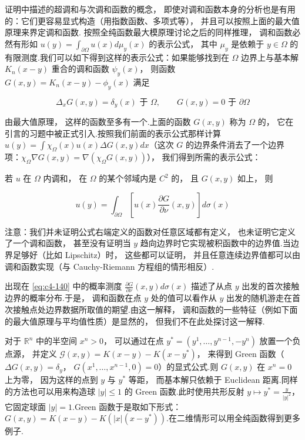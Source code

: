 证明中描述的超调和与次调和函数的概念， 即使对调和函数本身的分析也是有用的：它们更容易显式构造（用指数函数、多项式等）， 并且可以按照上面的最大值原理来界定调和函数.
按照全纯函数最大模原理讨论之后的同样推理， 调和函数必然有形如 $u(y) = \int_{\partial\Omega}u(x)d\mu_{y}(x)$ 的表示公式， 其中 $\mu_{y}$ 是依赖于 $y \in \Omega$ 的有限测度.我们可以如下得到这样的表示公式：如果能够找到在 $\Omega$ 边界上与基本解 $K_{n}(x-y)$ 重合的调和函数 $\psi_{y}(x)$， 则函数 $G(x, y) = K_{n}(x-y) - \phi_{y}(x)$ 满足

\[
\Delta_{x}G(x, y) = \delta_{y}(x) \text{ 于 } \Omega, \qquad G(x, y) = 0 \text{ 于 } \partial\Omega
\]

由最大值原理， 这样的函数至多有一个.上面的函数 $G(x, y)$ 称为 $\Omega$ 的， 它在引言的习题中被正式引入.按照我们前面的表示公式那样计算 $u(y) = \int\chi_{\Omega}(x)u(x)\Delta G(x, y)dx$（这次 $G$ 的边界条件消去了一个边界项：$\chi_{\Omega}\nabla G(x, y) = \nabla(\chi_{\Omega}G(x, y))$）， 我们得到所需的表示公式：

\begin{proposition}\label{prop:c4-2.4}
若 $u$ 在 $\Omega$ 内调和， 在 $\Omega$ 的某个邻域内是 $C^{2}$ 的， 且 $G(x, y)$ 如上， 则

\begin{equation}
u(y) = \int_{\partial\Omega}\left[u(x)\frac{\partial G}{\partial\nu}(x, y)\right]d\sigma(x)\label{eq:c4-140}
\end{equation}
\end{proposition}

\begin{remark*}
注意：我们并未证明公式右端定义的函数对任意区域都有定义， 也未证明它定义了一个调和函数， 甚至没有证明当 $y$ 趋向边界时它实现被积函数中的边界值.当边界足够好（比如 Lipschitz）时， 这些都可以证明， 并且任意连续边界值都可以由调和函数实现（与 Cauchy-Riemann 方程组的情形相反）.
\end{remark*}

出现在 \eqref{eq:c4-140} 中的概率测度 $\frac{\partial G}{\partial\nu}(x, y)d\sigma(x)$ 描述了从点 $y$ 出发的首次接触边界的概率分布.于是， 调和函数在点 $y$ 处的值可以看作从 $y$ 出发的随机游走在首次接触点处边界数据所取值的期望.由这一解释， 调和函数的一些特征（例如下面的最大值原理与平均值性质）是显然的， 但我们不在此处探讨这一解释.

\begin{example*}
对于 $\mathbb{R}^{n}$ 中的半空间 $x^{n} > 0$， 可以通过在点 $y^{*} = (y^{1}, \ldots, y^{n-1}, -y^{n})$ 放置一个负点源， 并定义 $\mathcal{G}(x, y) = K(x-y) - K(x-y^{*})$， 来得到 Green 函数（$\Delta G(x, y) = \delta_{y}$， $G(x^{1}, \ldots, x^{n-1}, 0) = 0$）的显式公式.则 $G(x, y)$ 在 $x^{n} = 0$ 上为零， 因为这样的点到 $y$ 与 $y^{*}$ 等距， 而基本解只依赖于 Euclidean 距离.同样的方法也可以用来构造球 $|y| \leq 1$ 的 Green 函数.此时使用共形反射 $y \mapsto y^{*} = \frac{y}{|y|^{2}}$， 它固定球面 $|y| = 1$.Green 函数于是取如下形式：$G(x, y) = K(x-y) - K(|x|(x-y^{*}))$.在二维情形可以用全纯函数得到更多例子.
\end{example*}

